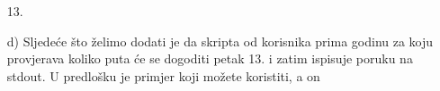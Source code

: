 \documentclass{exam}
\begin{document}
\begin{itemize}
                                                                13.
                                                                        \item[d)]
                                                                        Sljedeće
                                                                        što
                                                                        želimo
                                                                        dodati
                                                                        je da
                                                                        skripta
                                                                        od
                                                                        korisnika
                                                                        prima
                                                                        godinu
                                                                        za koju
                                                                        provjerava
                                                                        koliko
                                                                        puta će
                                                                        se
                                                                        dogoditi
                                                                        petak
                                                                        13. i
                                                                        zatim
                                                                        ispisuje
                                                                        poruku
                                                                        na
                                                                        stdout.
                                                                        U
                                                                        predlošku
                                                                        je
                                                                        primjer
                                                                        koji
                                                                        možete
                                                                        koristiti,
                                                                        a on

\end{itemize}
\end{document}
